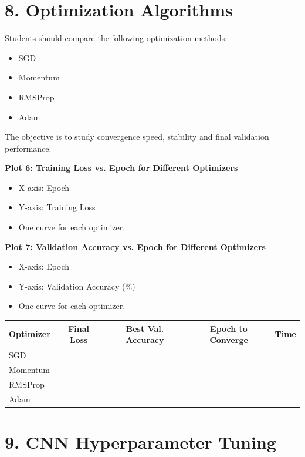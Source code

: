 \documentclass[10pt]{article}
\begin{document}
\section*{8. Optimization Algorithms}

Students should compare the following optimization methods:

\begin{itemize}
\item SGD
\item Momentum
\item RMSProp
\item Adam
\end{itemize}

The objective is to study convergence speed, stability and final
validation performance.

\textbf{Plot 6: Training Loss vs. Epoch for Different Optimizers}

\begin{itemize}
\item X-axis: Epoch
\item Y-axis: Training Loss
\item One curve for each optimizer.
\end{itemize}

\textbf{Plot 7: Validation Accuracy vs. Epoch for Different Optimizers}

\begin{itemize}
\item X-axis: Epoch
\item Y-axis: Validation Accuracy (\%)
\item One curve for each optimizer.
\end{itemize}

\begin{center}
\begin{tabular}{|l|c|c|c|c|}
\hline
Optimizer & Final Loss & Best Val. Accuracy & Epoch to Converge & Time\\
\hline
SGD & & & &\\
Momentum & & & &\\
RMSProp & & & &\\
Adam & & & &\\
\hline
\end{tabular}
\end{center}

\section*{9. CNN Hyperparameter Tuning}
\end{document}
